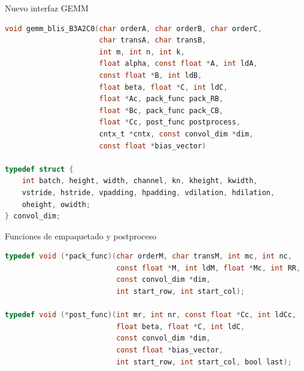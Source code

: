 \documentclass[aspectratio=43]{beamer}
\begin{document}
\begin{frame}%
\end{frame}

\begin{frame}[fragile]{Nuevo interfaz GEMM}
\begin{lstlisting}[language=C,basicstyle=\scriptsize\ttfamily]
void gemm_blis_B3A2C0(char orderA, char orderB, char orderC,
                      char transA, char transB,
                      int m, int n, int k,
                      float alpha, const float *A, int ldA,
                      const float *B, int ldB,
                      float beta, float *C, int ldC,
                      float *Ac, pack_func pack_RB,
                      float *Bc, pack_func pack_CB,
                      float *Cc, post_func postprocess,
                      cntx_t *cntx, const convol_dim *dim,
                      const float *bias_vector)

typedef struct {
    int batch, height, width, channel, kn, kheight, kwidth,
    vstride, hstride, vpadding, hpadding, vdilation, hdilation,
    oheight, owidth;
} convol_dim;
\end{lstlisting}
\end{frame}

\begin{frame}[fragile]{Funciones de empaquetado y postproceso}
\begin{lstlisting}[language=C,basicstyle=\scriptsize\ttfamily]
typedef void (*pack_func)(char orderM, char transM, int mc, int nc,
                          const float *M, int ldM, float *Mc, int RR,
                          const convol_dim *dim,
                          int start_row, int start_col);

typedef void (*post_func)(int mr, int nr, const float *Cc, int ldCc,
                          float beta, float *C, int ldC,
                          const convol_dim *dim,
                          const float *bias_vector,
                          int start_row, int start_col, bool last);
\end{lstlisting}
\end{frame}
\end{document}
